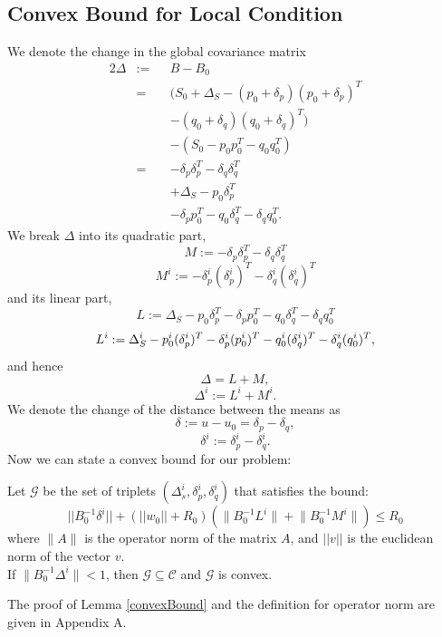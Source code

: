 \documentclass{vldb}
\begin{document}
\subsection{Convex Bound for Local Condition}
We denote the change in the global covariance matrix
\begin{alignat*}{2}
\Delta & := && B-B_0 \\
& = && (S_0+\Delta_S - (p_0+\delta_p)(p_0+\delta_p)^T \\
& && - (q_0+\delta_q)(q_0+\delta_q)^T) \\
& && - (S_0 - p_0p_0^T - q_0q_0^T) \\
& = && - \delta_p\delta_p^T - \delta_q\delta_q^T \\
& && + \Delta_S - p_0\delta_p^T \\
& && - \delta_pp_0^T - q_0\delta_q^T - \delta_qq_0^T.
\end{alignat*}
We break $\Delta$ into its quadratic part,
\begin{equation*}
M:= - \delta_p\delta_p^T - \delta_q\delta_q^T
\end{equation*}
\begin{equation*}
M^i:= - \delta_p^i(\delta_p^i)^T - \delta_q^i(\delta_q^i)^T
\end{equation*}
and its linear part,
\begin{equation*}
L:= \Delta_S - p_0\delta_p^T - \delta_pp_0^T - q_0\delta_q^T - \delta_qq_0^T
\end{equation*}
\begin{equation*}
\\ L^i := \Delta_S^i - p_0^i(\delta_p^i)^T - \delta_p^i(p_0^i)^T -
q_0^i(\delta_q^i)^T - \delta_q^i(q_0^i)^T,
\end{equation*}
and hence
\begin{equation*}
\Delta= L+ M, 
\end{equation*}
\begin{equation*}
\Delta^i:= L^i+ M^i.
\end{equation*}
We denote the change of the distance between the means as
\begin{equation*}
\delta:= u-u_0 = \delta_p - \delta_q, 
\end{equation*}
\begin{equation*}
\delta^i:=\delta_p^i - \delta_q^i.
\end{equation*}
Now we can state a convex bound for our problem:
\begin{lemma} \label{convexBound}
Let $\mathcal{G}$ be the set of triplets $(\Delta_s^i, \delta_p^i, \delta_q^i)$
 that satisfies the bound:
 \begin{equation} \label{eq:convexBound}
||B_0^{-1}\delta^i|| + (||w_0||+R_0)(\Big \| B_0^{-1}L^i \Big \| + \Big \| B_0^{-1}M^i \Big \| ) \leq  R_0
\end{equation}
where $\Big \| A \Big \|$ is the operator norm of the matrix $A$, and $||v||$ is the euclidean norm of the vector $v$.
\\If $\Big \| B_0^{-1}\Delta^i \Big \| < 1$, then $\mathcal{G}\subseteq \mathcal{C}$ and $\mathcal{G}$ is convex.
\end{lemma}
The proof of Lemma \ref{convexBound} and the definition for operator norm are given in Appendix A.
\end{document}
